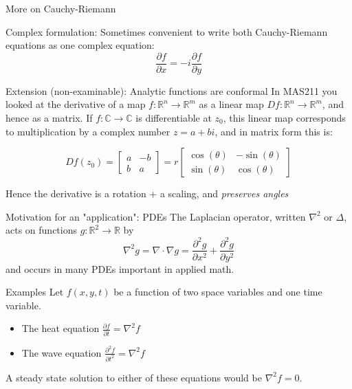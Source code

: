 \documentclass{beamer}
\newcommand{\C}{\mathbb{C}}
\newcommand{\R}{\mathbb{R}}
\begin{document}
\begin{frame}{More on Cauchy-Riemann}
\begin{block}{Complex formulation:}
Sometimes convenient to write both Cauchy-Riemann equations as one complex equation:
$$\frac{\partial f}{\partial x} = -i \frac{\partial f}{\partial y}$$
\end{block}


\begin{block}{Extension (non-examinable): Analytic functions are conformal}
In MAS211 you looked at the derivative of a map $f:\R^n\to\R^m$ as a linear map $Df:\R^n\to\R^m$, and hence as a matrix.  If $f:\C\to\C$ is differentiable at $z_0$, this linear map corresponds to multiplication by a complex number $z=a+bi$, and in matrix form this is:\newline

$$Df(z_0)=\begin{bmatrix} a & -b \\ b & a \end{bmatrix}=r\begin{bmatrix} \cos(\theta) & -\sin(\theta) \\ \sin(\theta) & \cos(\theta)\end{bmatrix}$$

Hence the derivative is a rotation + a scaling, and \emph{preserves angles}
\end{block}


\end{frame}

\begin{frame}{Motivation for an "application": PDEs}
The Laplacian operator, written $\nabla^2$ or $\Delta$, acts on functions $g:\R^2\to\R$ by
$$\nabla^2g=\nabla\cdot\nabla g=\frac{\partial^2 g}{\partial x^2}+\frac{\partial^2 g}{\partial y^2}$$
and occurs in many PDEs important in applied math.  

\begin{block}{Examples}
Let $f(x,y,t)$ be a function of two space variables and one time variable.
\begin{itemize}
    \item The heat equation $\frac{\partial f}{\partial t}=\nabla^2f$
    \item The wave equation $\frac{\partial^2 f}{\partial t^2}=\nabla^2f$
\end{itemize}
\end{block}
A steady state solution to either of these equations would be $\nabla^2f=0$.  
\end{frame}
\end{document}
